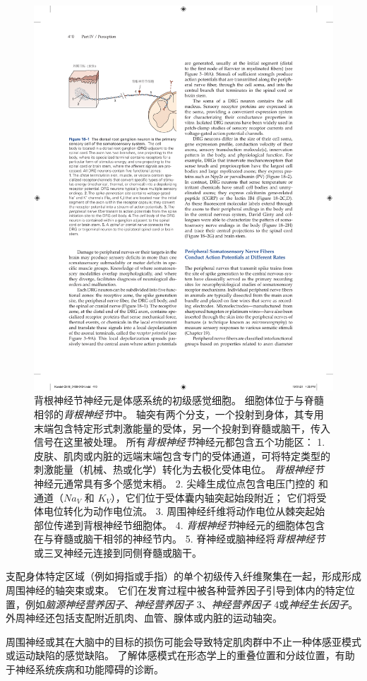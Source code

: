 \begin{figure}[htbp]
	\centering
	\includegraphics[width=0.65\linewidth]{chap18/fig_18_1}
	\caption{背根神经节神经元是体感系统的初级感觉细胞。 
		细胞体位于与脊髓相邻的\textit{背根神经节}中。
		轴突有两个分支，一个投射到身体，其专用末端包含特定形式刺激能量的受体，另一个投射到脊髓或脑干，传入信号在这里被处理。 
		所有\textit{背根神经节}神经元都包含五个功能区：
		1. 皮肤、肌肉或内脏的远端末端包含专门的受体通道，可将特定类型的刺激能量（机械、热或化学）转化为去极化受体电位。 
		\textit{背根神经节}神经元通常具有多个感觉末梢。
		2. 尖峰生成位点包含电压门控的  和  通道（$Na_V$ 和 $K_V$），它们位于受体囊内轴突起始段附近； 它们将受体电位转化为动作电位流。 
		3. 周围神经纤维将动作电位从棘突起始部位传递到背根神经节细胞体。 
		4. \textit{背根神经节}神经元的细胞体包含在与脊髓或脑干相邻的神经节内。 
		5. 脊神经或脑神经将\textit{背根神经节}或三叉神经元连接到同侧脊髓或脑干。}
	\label{fig:18_1}
\end{figure}


支配身体特定区域（例如拇指或手指）的单个初级传入纤维聚集在一起，形成形成周围神经的轴突束或束。
它们在发育过程中被各种营养因子引导到体内的特定位置，例如\textit{脑源神经营养因子}、\textit{神经营养因子} 3、\textit{神经营养因子} 4或\textit{神经生长因子}。
外周神经还包括支配附近肌肉、血管、腺体或内脏的运动轴突。


周围神经或其在大脑中的目标的损伤可能会导致特定肌肉群中不止一种体感亚模式或运动缺陷的感觉缺陷。
了解体感模式在形态学上的重叠位置和分歧位置，有助于神经系统疾病和功能障碍的诊断。


